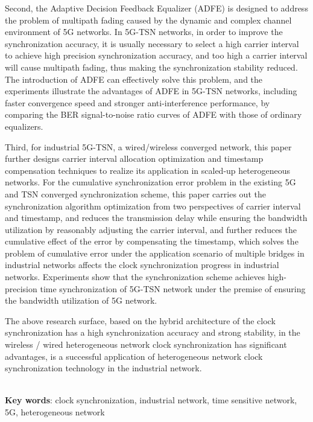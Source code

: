 \documentclass[UTF8,a4paper,12pt]{ctexart}
\numberwithin{equation}{section}
\begin{document}
	Second, the Adaptive Decision Feedback Equalizer (ADFE) is designed to address the problem of multipath fading caused by the dynamic and complex channel environment of 5G networks. In 5G-TSN networks, in order to improve the synchronization accuracy, it is usually necessary to select a high carrier interval to achieve high precision synchronization accuracy, and too high a carrier interval will cause multipath fading, thus making the synchronization stability reduced. The introduction of ADFE can effectively solve this problem, and the experiments illustrate the advantages of ADFE in 5G-TSN networks, including faster convergence speed and stronger anti-interference performance, by comparing the BER signal-to-noise ratio curves of ADFE with those of ordinary equalizers.
	
	Third, for industrial 5G-TSN, a wired/wireless converged network, this paper further designs carrier interval allocation optimization and timestamp compensation techniques to realize its application in scaled-up heterogeneous networks. For the cumulative synchronization error problem in the existing 5G and TSN converged synchronization scheme, this paper carries out the synchronization algorithm optimization from two perspectives of carrier interval and timestamp, and reduces the transmission delay while ensuring the bandwidth utilization by reasonably adjusting the carrier interval, and further reduces the cumulative effect of the error by compensating the timestamp, which solves the problem of cumulative error under the application scenario of multiple bridges in industrial networks affects the clock synchronization progress in industrial networks. Experiments show that the synchronization scheme achieves high-precision time synchronization of 5G-TSN network under the premise of ensuring the bandwidth utilization of 5G network.
	
	The above research surface, based on the hybrid architecture of the clock synchronization has a high synchronization accuracy and strong stability, in the wireless / wired heterogeneous network clock synchronization has significant advantages, is a successful application of heterogeneous network clock synchronization technology in the industrial network.
	
	\hspace{8mm} \par 
	~\\ 
	\textbf{Key words}: clock synchronization, industrial network, time sensitive network, 5G, heterogeneous network
	
\end{document}
